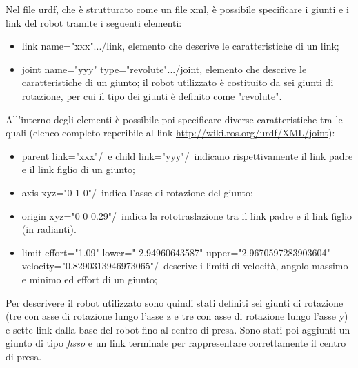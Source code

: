 Nel file urdf, che è strutturato come un file xml, è possibile specificare i giunti e i link del robot tramite i seguenti elementi:
\begin{itemize}
	\item \tl link name="xxx"\tr...\tl /link\tr, elemento che descrive le caratteristiche di un link;
	\item \tl joint name="yyy" type="revolute"\tr...\tl /joint\tr, elemento che descrive le caratteristiche di un giunto; il robot utilizzato è costituito da sei giunti di rotazione, per cui il tipo dei giunti è definito come "revolute".
\end{itemize}
All'interno degli elementi è possibile poi specificare diverse caratteristiche tra le quali (elenco completo reperibile al link \url{http://wiki.ros.org/urdf/XML/joint}):
\begin{itemize}
	\item  \tl parent link="xxx"/\tr\ e \tl child link="yyy"/\tr\ indicano rispettivamente il link padre e il link figlio di un giunto;
	\item \tl axis xyz="0 1 0"/\tr\ indica l'asse di rotazione del giunto;
	\item  \tl origin xyz="0 0 0.29"/\tr\ indica la rototraslazione tra il link padre e il link figlio (in radianti).
	\item \tl limit effort="1.09" lower="-2.94960643587" upper="2.9670597283903604" velocity="0.8290313946973065"/\tr \ descrive i limiti di velocità, angolo massimo e minimo ed effort di un giunto;
\end{itemize}
Per descrivere il robot utilizzato sono quindi stati definiti sei giunti di rotazione (tre con asse di rotazione lungo l'asse z e tre con asse di rotazione lungo l'asse y) e sette link dalla base del robot fino al centro di presa. Sono stati poi aggiunti un giunto di tipo \textit{fisso} e un link terminale per rappresentare correttamente il centro di presa.

\clearpage

